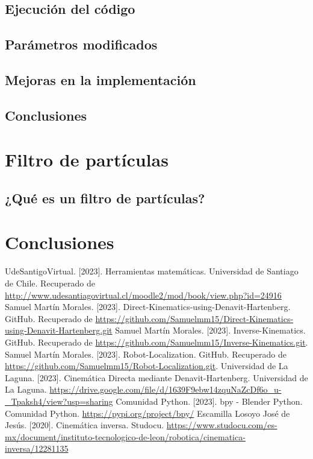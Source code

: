 \documentclass[11pt]{report}
\begin{document}
\section{Ejecución del código}

\section{Parámetros modificados}

\section{Mejoras en la implementación}

\section{Conclusiones}

\chapter{Filtro de partículas}

\section{¿Qué es un filtro de partículas?}

\chapter{Conclusiones}

\begin{thebibliography}{99}
   UdeSantigoVirtual. [2023]. Herramientas matemáticas. Universidad de Santiago de Chile. Recuperado de \url{http://www.udesantiagovirtual.cl/moodle2/mod/book/view.php?id=24916}
   Samuel Martín Morales. [2023]. Direct-Kinematics-using-Denavit-Hartenberg. GitHub. Recuperado de \url{https://github.com/Samuelmm15/Direct-Kinematics-using-Denavit-Hartenberg.git}
   Samuel Martín Morales. [2023]. Inverse-Kinematics. GitHub. Recuperado de \url{https://github.com/Samuelmm15/Inverse-Kinematics.git}.
   Samuel Martín Morales. [2023]. Robot-Localization. GitHub. Recuperado de \url{https://github.com/Samuelmm15/Robot-Localization.git}.
   Universidad de La Laguna. [2023]. Cinemática Directa mediante Denavit-Hartenberg. Universidad de La Laguna. \url{https://drive.google.com/file/d/1639F9ebw14zquNaZcDf6o_u-_Tpaksh4/view?usp=sharing}
   Comunidad Python. [2023]. bpy - Blender Python. Comunidad Python. \url{https://pypi.org/project/bpy/}
   Escamilla Losoyo José de Jesús. [2020]. Cinemática inversa. Studocu. \url{https://www.studocu.com/es-mx/document/instituto-tecnologico-de-leon/robotica/cinematica-inversa/12281135}
\end{thebibliography}
\end{document}
